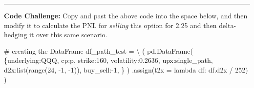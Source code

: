 \documentclass[
  letterpaper,
  DIV=11,
  numbers=noendperiod]{scrreprt}
\newenvironment{Shaded}{\begin{snugshade}}{\end{snugshade}}
\newcommand{\BuiltInTok}[1]{\textcolor[rgb]{0.00,0.23,0.31}{#1}}
\newcommand{\CommentTok}[1]{\textcolor[rgb]{0.37,0.37,0.37}{#1}}
\newcommand{\DecValTok}[1]{\textcolor[rgb]{0.68,0.00,0.00}{#1}}
\newcommand{\FloatTok}[1]{\textcolor[rgb]{0.68,0.00,0.00}{#1}}
\newcommand{\KeywordTok}[1]{\textcolor[rgb]{0.00,0.23,0.31}{#1}}
\newcommand{\NormalTok}[1]{\textcolor[rgb]{0.00,0.23,0.31}{#1}}
\newcommand{\OperatorTok}[1]{\textcolor[rgb]{0.37,0.37,0.37}{#1}}
\newcommand{\StringTok}[1]{\textcolor[rgb]{0.13,0.47,0.30}{#1}}
\begin{document}
\begin{center}\rule{0.5\linewidth}{0.5pt}\end{center}

\textbf{Code Challenge:} Copy and past the above code into the space
below, and then modify it to calculate the PNL for \emph{selling} this
option for 2.25 and then delta-hedging it over this same scenario.

\begin{Shaded}
\begin{Highlighting}[]
\CommentTok{\# creating the DataFrame}
\NormalTok{df\_path\_test }\OperatorTok{=} \OperatorTok{\textbackslash{}}
\NormalTok{    (}
\NormalTok{    pd.DataFrame(}
\NormalTok{        \{}\StringTok{\textquotesingle{}underlying\textquotesingle{}}\NormalTok{:}\StringTok{\textquotesingle{}QQQ\textquotesingle{}}\NormalTok{,}
         \StringTok{\textquotesingle{}cp\textquotesingle{}}\NormalTok{:}\StringTok{\textquotesingle{}p\textquotesingle{}}\NormalTok{,}
         \StringTok{\textquotesingle{}strike\textquotesingle{}}\NormalTok{:}\DecValTok{160}\NormalTok{,}
         \StringTok{\textquotesingle{}volatility\textquotesingle{}}\NormalTok{:}\FloatTok{0.2636}\NormalTok{,}
         \StringTok{\textquotesingle{}upx\textquotesingle{}}\NormalTok{:single\_path, }
         \StringTok{\textquotesingle{}d2x\textquotesingle{}}\NormalTok{:}\BuiltInTok{list}\NormalTok{(}\BuiltInTok{range}\NormalTok{(}\DecValTok{24}\NormalTok{, }\OperatorTok{{-}}\DecValTok{1}\NormalTok{, }\OperatorTok{{-}}\DecValTok{1}\NormalTok{)),}
         \StringTok{\textquotesingle{}buy\_sell\textquotesingle{}}\NormalTok{:}\OperatorTok{{-}}\DecValTok{1}\NormalTok{,}
\NormalTok{        \}       }
\NormalTok{    )}
\NormalTok{    .assign(t2x }\OperatorTok{=} \KeywordTok{lambda}\NormalTok{ df: df.d2x }\OperatorTok{/} \DecValTok{252}\NormalTok{)}
\NormalTok{    )}


\end{Highlighting}
\end{Shaded}
\end{document}
